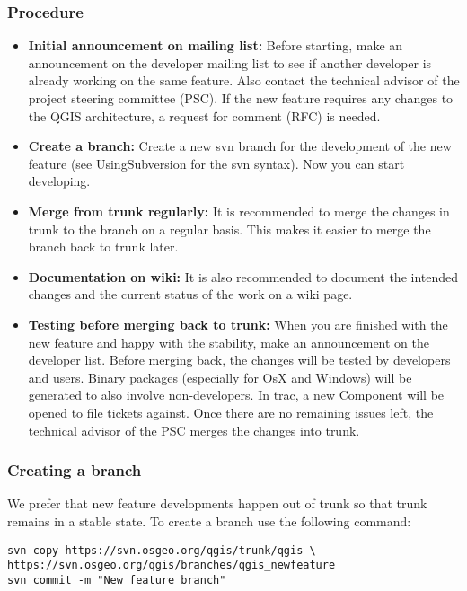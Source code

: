 \subsubsection{Procedure}
\begin{itemize}
\item \textbf{Initial announcement on mailing list:}
Before starting, make an announcement on the developer mailing list to see if
another developer is already working on the same feature. Also contact the
technical advisor of the project steering committee (PSC). If the new feature
requires any changes to the QGIS architecture, a request for comment (RFC) is
needed. 

\item \textbf{Create a branch:} 
Create a new svn branch for the development of the new feature (see
UsingSubversion for the svn syntax). Now you can start developing.

\item \textbf{Merge from trunk regularly:}
It is recommended to merge the changes in trunk to the branch on a regular
basis. This makes it easier to merge the branch back to trunk later.

\item \textbf{Documentation on wiki:} 
It is also recommended to document the intended changes and the current status
of the work on a wiki page.

\item \textbf{Testing before merging back to trunk:} 
When you are finished with the new feature and happy with the stability, make
an announcement on the developer list.  Before merging back, the changes will
be tested by developers and users. Binary packages (especially for OsX and
Windows) will be generated to also involve non-developers. In trac, a new
Component will be opened to file tickets against.  Once there are no remaining
issues left, the technical advisor of the PSC merges the changes into trunk.

\end{itemize}


\hypertarget{toc37}{}
\subsubsection{Creating a branch}
We prefer that new feature developments happen out of trunk so that trunk
remains in a stable state. To create a branch use the following command:

\begin{verbatim}
svn copy https://svn.osgeo.org/qgis/trunk/qgis \
https://svn.osgeo.org/qgis/branches/qgis_newfeature
svn commit -m "New feature branch"
\end{verbatim}

